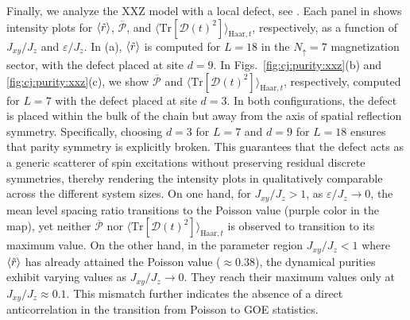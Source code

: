 \documentclass[letterpaper,superscriptaddress,aps,pra,nolongbibliography,showpacs,floatfix,dvipsnames,10pt,twocolumn]{revtex4-2}
\newcommand{\choip}{\langle \text{Tr}[\mathcal{D}(t)^2] \rangle_{\mathrm{Haar}, t}}
\newcommand{\statep}{\overline{\mathcal{P}}}
\newcommand{\mlsr}{\ev{\tilde{r}}}
\begin{document}
Finally, we analyze the XXZ model with a local defect, see
. Each panel in  shows
intensity plots for $\mlsr$, $\statep$, and $\choip$, respectively,
as a function of $J_{xy} / J_z$ and $\varepsilon / J_z$.
In (a), $\expval{\tilde{r}}$ is computed
for $L=18$ in the $N_{\uparrow}=7$ magnetization sector, with the
defect placed at site $d=9$.
In Figs.~\ref{fig:cj:purity:xxz}(b) and \ref{fig:cj:purity:xxz}(c),
we show $\statep$ and $\choip$, respectively, computed for $L=7$
with the defect placed at site $d=3$.
In both configurations, the defect is placed within the bulk of the
chain but away from the axis of spatial reflection symmetry.
Specifically, choosing $d=3$ for $L=7$ and $d=9$ for $L=18$
ensures that parity symmetry is explicitly broken. This guarantees
that the defect acts as a generic scatterer of spin excitations 
without preserving residual discrete symmetries, thereby rendering the 
intensity plots in  qualitatively comparable across the
different system sizes.
On one hand, for $J_{xy}/J_z > 1$, as $\varepsilon/J_z \to 0$, the
mean level spacing ratio transitions to the Poisson value (purple
color in the map), yet neither $\statep$ nor $\choip$ is observed
to transition to its maximum value. On the other hand, in the
parameter region $J_{xy} / J_z < 1$ where $\mlsr$ has already
attained the Poisson value ($\approx 0.38$), the dynamical purities
exhibit varying values as $J_{xy} / J_z \to 0$. They reach their
maximum values only at $J_{xy} / J_z \approx 0.1$. This mismatch
further indicates the absence of a direct anticorrelation in the
transition from Poisson to GOE statistics.
\end{document}
